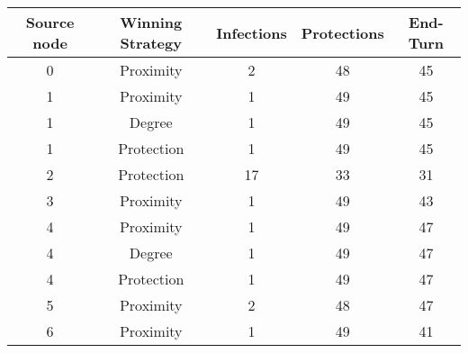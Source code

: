 \documentclass[results.tex]{subfiles}
\begin{document}
    \begin{center}
        \begin{tabular}{| c || c | c | c | c |}
            \hline
            {\bfseries Source node} & {\bfseries Winning Strategy} & {\bfseries Infections} & {\bfseries Protections}
            & {\bfseries End-Turn}
            \\  %
            \hline\hline
            0                       & Proximity                    & 2                      & 48                      & 45                   \\
            \hline
            1                       & Proximity                    & 1                      & 49                      & 45                   \\
            \hline
            1                       & Degree                       & 1                      & 49                      & 45                   \\
            \hline
            1                       & Protection                   & 1                      & 49                      & 45                   \\
            \hline
            2                       & Protection                   & 17                     & 33                      & 31                   \\
            \hline
            3                       & Proximity                    & 1                      & 49                      & 43                   \\
            \hline
            4                       & Proximity                    & 1                      & 49                      & 47                   \\
            \hline
            4                       & Degree                       & 1                      & 49                      & 47                   \\
            \hline
            4                       & Protection                   & 1                      & 49                      & 47                   \\
            \hline
            5                       & Proximity                    & 2                      & 48                      & 47                   \\
            \hline
            6                       & Proximity                    & 1                      & 49                      & 41                   \\

\end{tabular}
\end{center}
\end{document}
